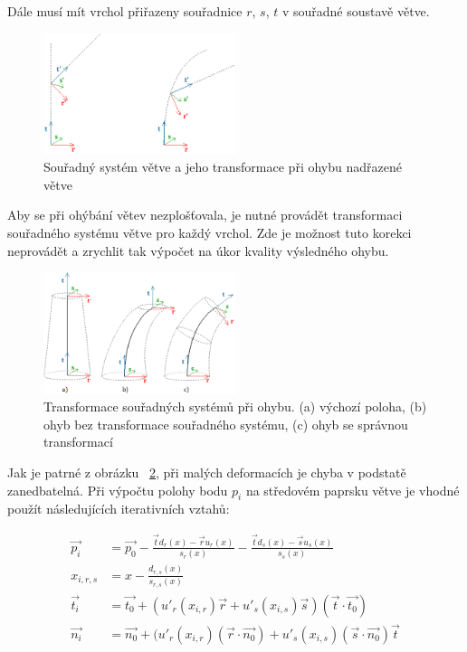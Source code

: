 Dále musí mít vrchol přiřazeny souřadnice $r$, $s$, $t$ v souřadné soustavě větve.
\begin{figure}[!hbt]
\begin{center}
\includegraphics[width=0.5\textwidth]{./figures/coordTransf.png}
\end{center}
\caption{ Souřadný systém větve a jeho transformace při ohybu nadřazené větve
\label{fig:transfCoordSys}
}
\end{figure}	 
Aby se při ohýbání větev nezplošťovala, je nutné provádět transformaci souřadného systému větve pro každý vrchol. Zde je možnost tuto korekci neprovádět a zrychlit tak výpočet na úkor kvality výsledného ohybu.

	 
\begin{figure}[!hbt]
\begin{center}
\includegraphics[width=0.5\textwidth]{./figures/branchBend.png}
\end{center}
\caption{  Transformace souřadných systémů při ohybu.
(a) výchozí poloha, (b) ohyb bez transformace souřadného systému, (c) ohyb se správnou transformací
\label{fig:bendCoordSys}
}
\end{figure}

Jak je patrné z obrázku ~\ref{fig:bendCoordSys}, při malých deformacích je chyba v podstatě zanedbatelná. Při výpočtu polohy bodu $p_i$ na středovém paprsku větve je vhodné použít následujících iterativních vztahů:

\begin{align} 
\overrightarrow{p_{i}} &= \overrightarrow{p_{0}} - \frac{\overrightarrow{t}d_{r}(x)-\overrightarrow{r}u_{r}(x)}{s_{r}(x)}-\frac{\overrightarrow{t}d_{s}(x)-\overrightarrow{s}u_{s}(x)}{s_{s}(x)}\nonumber\\
x_{i,r,s} &= x - \frac{d_{r,s}(x)}{s_{r,s}(x)}\nonumber\\
\overrightarrow{t_{i}} &=  \overrightarrow{t_{0}} + (u'_{r}(x_{i,r})\overrightarrow{r} + u'_{s}(x_{i,s})\overrightarrow{s})(\overrightarrow{t}\cdot\overrightarrow{t_{0}})\\
\overrightarrow{n_{i}} &=  \overrightarrow{n_{0}} + (u'_{r}(x_{i,r})(\overrightarrow{r} \cdot \overrightarrow{n_{0}}) + u'_{s}(x_{i,s})(\overrightarrow{s} \cdot \overrightarrow{n_{0}})\overrightarrow{t}
\end{align}


